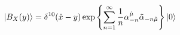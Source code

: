\begin{equation}
 | B_X(y) \rangle
 = \delta^{10} ({\hat x}-y)
   \exp \left\{
    {\sum_{n=1}^\infty {1 \over n}
     \alpha^{\hat \mu}_{-n} {\tilde \alpha}_{-n {\hat \mu}}} \right\}
   | 0 \rangle
\label{B_X}
\end{equation}

